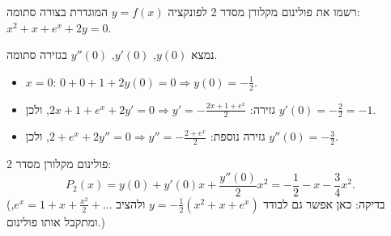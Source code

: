 
\begin{question}
רשמו את פולינום מקלורן מסדר 2 לפונקציה $y=f(x)$ המוגדרת בצורה סתומה: $x^2+x+e^x+2y=0$.
\end{question}

\begin{solution}
נמצא $y(0)$, $y'(0)$, $y''(0)$ בגזירה סתומה.
\begin{itemize}
  \item $x=0$: $0+0+1+2y(0)=0\Rightarrow y(0)=-\frac12$.
  \item גזירה: $2x+1+e^x+2y'=0\Rightarrow y'=-\frac{2x+1+e^x}{2}$, ולכן $y'(0)=-\frac{2}{2}=-1$.
  \item גזירה נוספת: $2+e^x+2y''=0\Rightarrow y''=-\frac{2+e^x}{2}$, ולכן $y''(0)=-\frac32$.
\end{itemize}
פולינום מקלורן מסדר 2:
\[ P_2(x)=y(0)+y'(0)x+\frac{y''(0)}{2}x^2=\boxed{-\frac12-x-\frac34x^2}. \]
(בדיקה: כאן אפשר גם לבודד $y=-\frac12(x^2+x+e^x)$ ולהציב $e^x=1+x+\frac{x^2}{2}+\dots$, ומתקבל אותו פולינום.)
\end{solution}
